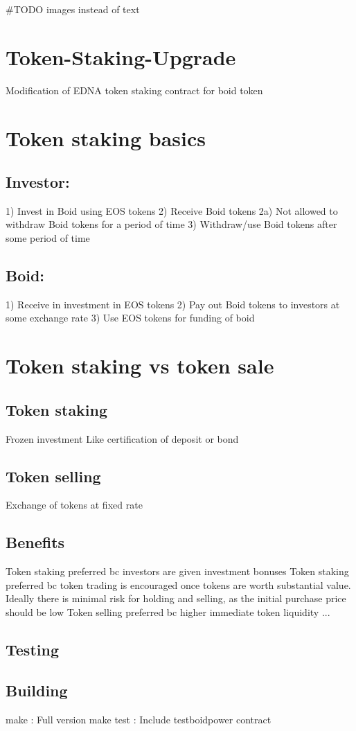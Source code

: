 \#\+T\+O\+DO images instead of text \section*{Token-\/\+Staking-\/\+Upgrade}

Modification of E\+D\+NA token staking contract for boid token

\section*{Token staking basics}

\subsection*{Investor\+:}

1) Invest in Boid using E\+OS tokens 2) Receive Boid tokens 2a) Not allowed to withdraw Boid tokens for a period of time 3) Withdraw/use Boid tokens after some period of time

\subsection*{Boid\+:}

1) Receive in investment in E\+OS tokens 2) Pay out Boid tokens to investors at some exchange rate 3) Use E\+OS tokens for funding of boid

\section*{Token staking vs token sale}

\subsection*{Token staking}

Frozen investment Like certification of deposit or bond

\subsection*{Token selling}

Exchange of tokens at fixed rate

\subsection*{Benefits}

Token staking preferred bc investors are given investment bonuses Token staking preferred bc token trading is encouraged once tokens are worth substantial value. Ideally there is minimal risk for holding and selling, as the initial purchase price should be low Token selling preferred bc higher immediate token liquidity ...

\subsection*{Testing}

\subsection*{Building}

make \+: Full version make test \+: Include testboidpower contract 